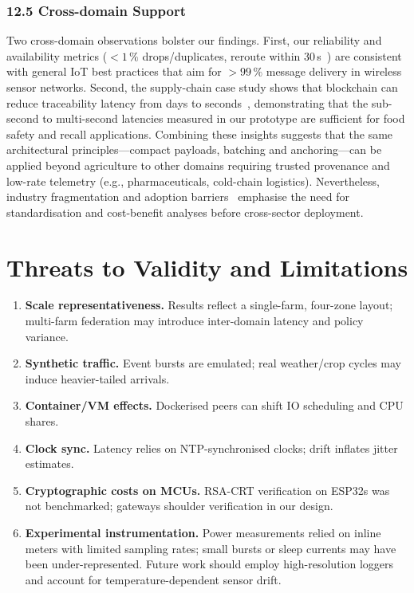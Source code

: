 \documentclass[12pt,onecolumn]{IEEEtran} %
\begin{document}
\subsubsection*{12.5 Cross-domain Support}
Two cross-domain observations bolster our findings. First, our reliability and availability metrics ($<1\,\%$ drops/duplicates, reroute within 30\,s~\cite{ref76853680998234}) are consistent with general IoT best practices that aim for $>99\,\%$ message delivery in wireless sensor networks. Second, the supply-chain case study shows that blockchain can reduce traceability latency from days to seconds~\cite{ref510439910314487}, demonstrating that the sub-second to multi-second latencies measured in our prototype are sufficient for food safety and recall applications. Combining these insights suggests that the same architectural principles—compact payloads, batching and anchoring—can be applied beyond agriculture to other domains requiring trusted provenance and low-rate telemetry (e.g., pharmaceuticals, cold-chain logistics). Nevertheless, industry fragmentation and adoption barriers~\cite{ref167328542643761} emphasise the need for standardisation and cost-benefit analyses before cross-sector deployment.

\section{Threats to Validity and Limitations}
\begin{enumerate}
  \item \textbf{Scale representativeness.} Results reflect a single-farm, four-zone layout; multi-farm federation may introduce inter-domain latency and policy variance.
  \item \textbf{Synthetic traffic.} Event bursts are emulated; real weather/crop cycles may induce heavier-tailed arrivals.
  \item \textbf{Container/VM effects.} Dockerised peers can shift IO scheduling and CPU shares.
  \item \textbf{Clock sync.} Latency relies on NTP-synchronised clocks; drift inflates jitter estimates.
  \item \textbf{Cryptographic costs on MCUs.} RSA-CRT verification on ESP32s was not benchmarked; gateways shoulder verification in our design.
  \item \textbf{Experimental instrumentation.} Power measurements relied on inline meters with limited sampling rates; small bursts or sleep currents may have been under-represented. Future work should employ high-resolution loggers and account for temperature-dependent sensor drift.
\end{enumerate}
\end{document}
